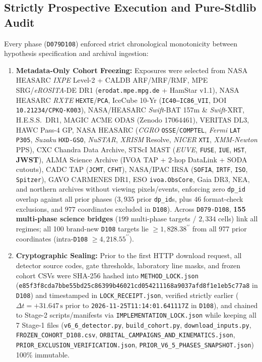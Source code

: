 \documentclass[twocolumn,10pt]{article}
\begin{document}
\subsection{Strictly Prospective Execution and Pure-Stdlib Audit}
Every phase (\texttt{D079}\text{--}\texttt{D108}) enforced strict chronological monotonicity between hypothesis specification and archival ingestion:
\begin{enumerate}
  \item \textbf{Metadata-Only Cohort Freezing:} Exposures were selected from NASA HEASARC \textit{IXPE} Level-2 + CALDB ARF/MRF/RMF, MPE SRG/\textit{eROSITA}-DE DR1 (\texttt{erodat.mpe.mpg.de} + HamStar v1.1), NASA HEASARC \textit{RXTE} \texttt{HEXTE}/\texttt{PCA}, IceCube 10-Yr (\texttt{IC40--IC86\_VII}, DOI \texttt{10.21234/CPKQ-K003}), NASA/HEASARC \textit{Swift}-BAT 157m \& \textit{Swift}-XRT, H.E.S.S.\ DR1, MAGIC ACME ODAS (Zenodo 17064461), VERITAS DL3, HAWC Pass-4 GP, NASA HEASARC (\textit{CGRO} \texttt{OSSE}/\texttt{COMPTEL}, \textit{Fermi} \texttt{LAT} \texttt{P305}, \textit{Suzaku} \texttt{HXD-GSO}, \textit{NuSTAR}, \textit{XRISM} Resolve, \textit{NICER} \texttt{XTI}, \textit{XMM-Newton} PPS), CXC Chandra Data Archive, STScI MAST (\textit{EUVE}, \texttt{FUSE}, \texttt{IUE}, \texttt{HST}, \textbf{JWST}), ALMA Science Archive (IVOA TAP + 2-hop DataLink + SODA cutouts), CADC TAP (\texttt{JCMT}, \texttt{CFHT}), NASA/IPAC IRSA (\texttt{SOFIA}, \texttt{IRTF}, \texttt{ISO}, \texttt{Spitzer}), GAVO CARMENES DR1, ESO \texttt{ivoa.ObsCore}, Gaia DR3, NEA, and northern archives without viewing pixels/events, enforcing zero \texttt{dp\_id} overlap against all prior phases ($3{,}935$ prior \texttt{dp\_id}s, plus $46$ format-check exclusions, and $977$ coordinates excluded in \texttt{D108}). Across \texttt{D079-D108}, \textbf{155 multi-phase science bridges} ($199$ multi-phase targets / $2{,}334$ cells) link all regimes; all 100 brand-new \texttt{D108} targets lie $\ge 1{,}828.38^{\prime\prime}$ from all 977 prior coordinates (intra-\texttt{D108} $\ge 4{,}218.55^{\prime\prime}$).
  \item \textbf{Cryptographic Sealing:} Prior to the first HTTP download request, all detector source codes, gate thresholds, laboratory line masks, and frozen cohort CSVs were SHA-256 hashed into \texttt{METHOD\_LOCK.json} (\texttt{e85f3f8c\allowbreak da7bbe55\allowbreak bd25c863\allowbreak 99b46021\allowbreak cd054211\allowbreak 168a9037\allowbreak afd8f1e1\allowbreak eb5c77a8} in \texttt{D108}) and timestamped in \texttt{LOCK\_RECEIPT.json}, verified strictly earlier ($\Delta t = +31.647\,\text{s}$ prior to \texttt{2026-11-25T11:14:01.641117Z} in \texttt{D108}), and chained to Stage-2 scripts/manifests via \texttt{IMPLEMENTATION\_LOCK.json} while keeping all 7 Stage-1 files (\texttt{v6\_6\_detector.py}, \texttt{build\_cohort.py}, \texttt{download\_inputs.py}, \texttt{FROZEN\_COHORT\_D108.csv}, \texttt{ORBITAL\_CAMPAIGNS\_AND\_KINEMATICS.json}, \texttt{PRIOR\_EXCLUSION\_VERIFICATION.json}, \texttt{PRIOR\_V6\_5\_PHASES\_SNAPSHOT.json}) 100\% immutable.

\end{enumerate}
\end{document}
